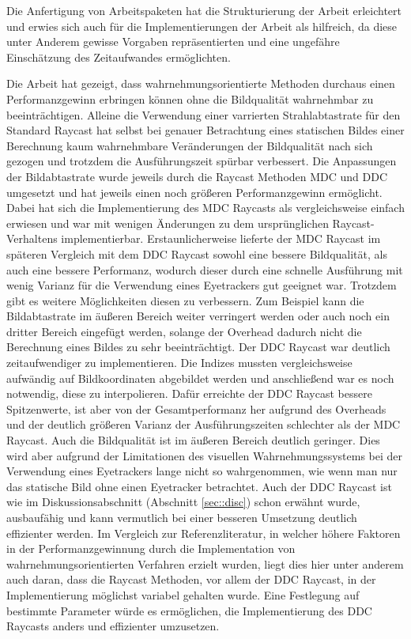 Die Anfertigung von Arbeitspaketen hat die Strukturierung der Arbeit erleichtert und erwies sich auch für die Implementierungen der Arbeit als hilfreich, da diese unter Anderem gewisse Vorgaben repräsentierten und eine ungefähre Einschätzung des Zeitaufwandes ermöglichten.

Die Arbeit hat gezeigt, dass wahrnehmungsorientierte Methoden durchaus einen Performanzgewinn erbringen können ohne die Bildqualität wahrnehmbar zu beeinträchtigen.
Alleine die Verwendung einer varrierten Strahlabtastrate für den Standard Raycast hat selbst bei genauer Betrachtung eines statischen Bildes einer Berechnung kaum wahrnehmbare Veränderungen der Bildqualität nach sich gezogen und trotzdem die Ausführungszeit spürbar verbessert.
Die Anpassungen der Bildabtastrate wurde jeweils durch die Raycast Methoden MDC und DDC umgesetzt und hat jeweils einen noch größeren Performanzgewinn ermöglicht.
Dabei hat sich die Implementierung des MDC Raycasts als vergleichsweise einfach erwiesen und war mit wenigen Änderungen zu dem ursprünglichen Raycast-Verhaltens implementierbar.
Erstaunlicherweise lieferte der MDC Raycast im späteren Vergleich mit dem DDC Raycast sowohl eine bessere Bildqualität, als auch eine bessere Performanz, wodurch dieser durch eine schnelle Ausführung mit wenig Varianz für die Verwendung eines Eyetrackers gut geeignet war.
Trotzdem gibt es weitere Möglichkeiten diesen zu verbessern. 
Zum Beispiel kann die Bildabtastrate im äußeren Bereich weiter verringert werden oder auch noch ein dritter Bereich eingefügt werden, solange der Overhead dadurch nicht die Berechnung eines Bildes zu sehr beeinträchtigt.
Der DDC Raycast war deutlich zeitaufwendiger zu implementieren.
Die Indizes mussten vergleichsweise aufwändig auf Bildkoordinaten abgebildet werden und anschließend war es noch notwendig, diese zu interpolieren.
Dafür erreichte der DDC Raycast bessere Spitzenwerte, ist aber von der Gesamtperformanz her aufgrund des Overheads und der deutlich größeren Varianz der Ausführungszeiten schlechter als der MDC Raycast.
Auch die Bildqualität ist im äußeren Bereich deutlich geringer.
Dies wird aber aufgrund der Limitationen des visuellen Wahrnehmungssystems bei der Verwendung eines Eyetrackers lange nicht so wahrgenommen, wie wenn man nur das statische Bild ohne einen Eyetracker betrachtet.
Auch der DDC Raycast ist wie im Diskussionsabschnitt (Abschnitt \ref{sec::disc}) schon erwähnt wurde, ausbaufähig und kann vermutlich bei einer besseren Umsetzung deutlich effizienter werden.
Im Vergleich zur Referenzliteratur, in welcher höhere Faktoren in der Performanzgewinnung durch die Implementation von wahrnehmungsorientierten Verfahren erzielt wurden, liegt dies hier unter anderem auch daran, dass die Raycast Methoden, vor allem der DDC Raycast, in der Implementierung möglichst variabel gehalten wurde.
Eine Festlegung auf bestimmte Parameter würde es ermöglichen, die Implementierung des DDC Raycasts anders und effizienter umzusetzen.

